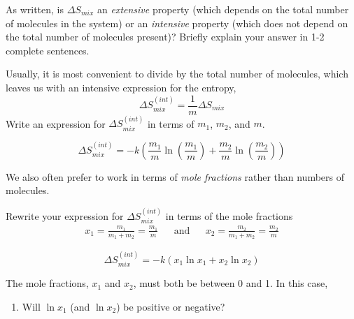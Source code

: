 \begin{activity}
\begin{ctqs}
	\question As written, is $\Delta S_{mix}$ an \emph{extensive} property (which depends on the total number of molecules in the system) or an \emph{intensive} property (which does not depend on the total number of molecules present)?  Briefly explain your answer in 1-2 complete sentences.
	
		\begin{solution}[1.5in]
		\end{solution}
	
	\question Usually, it is most convenient to divide by the total number of molecules, which leaves us with an intensive expression for the entropy,
		\begin{equation*}
			\Delta S_{mix}^{(int)} = \frac{1}{m} \Delta S_{mix}
		\end{equation*}
		Write an expression for $\Delta S_{mix}^{(int)}$ in terms of $m_1$, $m_2$, and $m$.
		
			\begin{solution}[1in]
			
				\begin{equation*}
					\Delta S_{mix}^{(int)} = -k\left(\frac{m_1}{m} \ln\left(\frac{m_1}{m}\right) + \frac{m_2}{m} \ln\left(\frac{m_2}{m}\right) \right)
				\end{equation*}
			\end{solution}
		
	\question We also often prefer to work in terms of \emph{mole fractions} rather than numbers of molecules. \label{ctq:Smixed}
	
		Rewrite your expression for $\Delta S_{mix}^{(int)}$ in terms of the mole fractions
		\begin{align*}
			x_1 = \frac{m_1}{m_1 + m_2} = \frac{m_1}{m} && \text{and} && x_2 = \frac{m_2}{m_1+m_2} = \frac{m_2}{m}
		\end{align*}
		
			\begin{solution}[1in]
			
				\begin{equation*}
					\Delta S_{mix}^{(int)} = -k\left(x_1 \ln x_1 + x_2 \ln x_2 \right)
				\end{equation*}
			\end{solution}
		
	\question The mole fractions, $x_1$ and $x_2$, must both be between 0 and 1.  In this case,
		\begin{enumerate}
			\item Will $\ln x_1$ (and $\ln x_2$) be positive or negative?
	

\end{enumerate}
\end{ctqs}
\end{activity}
